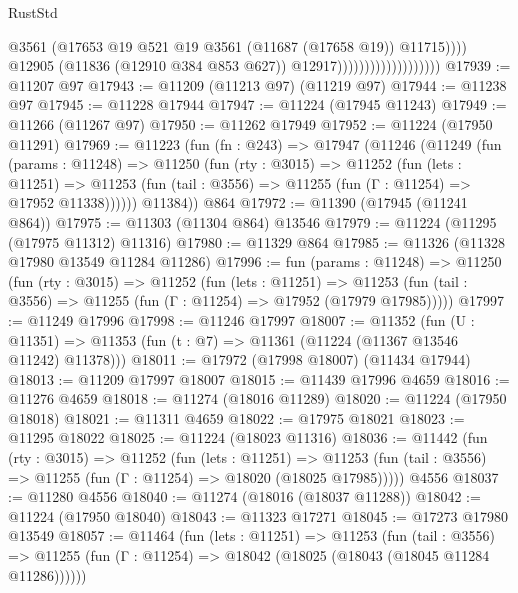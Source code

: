 \begin{lexlean}{RustStd}
\begin{coremodule}
                                                @3561
                                                (@17653
                                                  @19
                                                  @521
                                                  @19
                                                  @3561
                                                  (@11687 (@17658 @19))
                                                  @11715))))
                                          @12905
                                          (@11836 (@12910 @384 @853 @627))
                                          @12917)))))))))))))))))))
@17939 := @11207 @97
@17943 := @11209 (@11213 @97) (@11219 @97)
@17944 := @11238 @97
@17945 := @11228 @17944
@17947 := @11224 (@17945 @11243)
@17949 := @11266 (@11267 @97)
@17950 := @11262 @17949
@17952 := @11224 (@17950 @11291)
@17969 := @11223
    (fun (fn : @243) =>
    @17947
      (@11246
        (@11249
          (fun (params : @11248) =>
          @11250
            (fun (rty : @3015) =>
            @11252
              (fun (lets : @11251) =>
              @11253 (fun (tail : @3556) => @11255 (fun (Γ : @11254) => @17952 @11338))))))
        @11384))
    @864
@17972 := @11390 (@17945 (@11241 @864))
@17975 := @11303 (@11304 @864) @13546
@17979 := @11224 (@11295 (@17975 @11312) @11316)
@17980 := @11329 @864
@17985 := @11326 (@11328 @17980 @13549 @11284 @11286)
@17996 := fun (params : @11248) =>
  @11250
    (fun (rty : @3015) =>
    @11252
      (fun (lets : @11251) =>
      @11253 (fun (tail : @3556) => @11255 (fun (Γ : @11254) => @17952 (@17979 @17985)))))
@17997 := @11249 @17996
@17998 := @11246 @17997
@18007 := @11352
    (fun (U : @11351) => @11353 (fun (t : @7) => @11361 (@11224 (@11367 @13546 @11242) @11378)))
@18011 := @17972 (@17998 @18007) (@11434 @17944)
@18013 := @11209 @17997 @18007
@18015 := @11439 @17996 @4659
@18016 := @11276 @4659
@18018 := @11274 (@18016 @11289)
@18020 := @11224 (@17950 @18018)
@18021 := @11311 @4659
@18022 := @17975 @18021
@18023 := @11295 @18022
@18025 := @11224 (@18023 @11316)
@18036 := @11442
    (fun (rty : @3015) =>
    @11252
      (fun (lets : @11251) =>
      @11253 (fun (tail : @3556) => @11255 (fun (Γ : @11254) => @18020 (@18025 @17985)))))
    @4556
@18037 := @11280 @4556
@18040 := @11274 (@18016 (@18037 @11288))
@18042 := @11224 (@17950 @18040)
@18043 := @11323 @17271
@18045 := @17273 @17980 @13549
@18057 := @11464
    (fun (lets : @11251) =>
    @11253
      (fun (tail : @3556) =>
      @11255 (fun (Γ : @11254) => @18042 (@18025 (@18043 (@18045 @11284 @11286))))))

\end{coremodule}
\end{lexlean}
